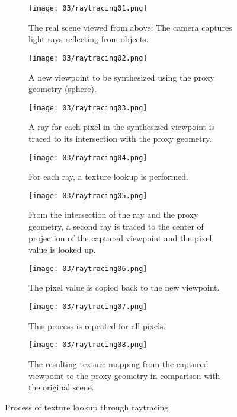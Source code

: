 \begin{figure}
\centering
    \hfill
    \begin{subfigure}[t]{0.3\textwidth}            
            \centering
            \texttt{[image: 03/raytracing01.png]}
            \caption{The real scene viewed from above: The camera captures light rays reflecting from objects.}
    \end{subfigure}%
    \hfill
    \begin{subfigure}[t]{0.3\textwidth}
            \centering
            \texttt{[image: 03/raytracing02.png]}
            \caption{A new viewpoint to be synthesized using the proxy geometry (sphere).}
    \end{subfigure}
    \hfill
    \hfill

    \hfill
    \begin{subfigure}[t]{0.3\textwidth}            
            \centering
            \texttt{[image: 03/raytracing03.png]}
            \caption{A ray for each pixel in the synthesized viewpoint is traced to its intersection with the proxy geometry.}
    \end{subfigure}%
    \hfill
    \begin{subfigure}[t]{0.3\textwidth}
            \centering
            \texttt{[image: 03/raytracing04.png]}
            \caption{For each ray, a texture lookup is performed.}
    \end{subfigure}
    \hfill
    \begin{subfigure}[t]{0.3\textwidth}
            \centering
            \texttt{[image: 03/raytracing05.png]}
            \caption{From the intersection of the ray and the proxy geometry, a second ray is traced to the center of projection of the captured viewpoint and the pixel value is looked up.}
    \end{subfigure}
    \hfill

    \hfill
    \begin{subfigure}[t]{0.3\textwidth}            
            \centering
            \texttt{[image: 03/raytracing06.png]}
            \caption{The pixel value is copied back to the new viewpoint.}
    \end{subfigure}%
    \hfill
    \begin{subfigure}[t]{0.3\textwidth}
            \centering
            \texttt{[image: 03/raytracing07.png]}
            \caption{This process is repeated for all pixels.}
    \end{subfigure}
    \hfill
    \begin{subfigure}[t]{0.3\textwidth}
            \centering
            \texttt{[image: 03/raytracing08.png]}
            \caption{The resulting texture mapping from the captured viewpoint to the proxy geometry in comparison with the original scene.}
    \end{subfigure}
    \hfill
    \caption[Texture lookup through raytracing]{Process of texture lookup through raytracing}\label{fig:raytracing}
\end{figure}
